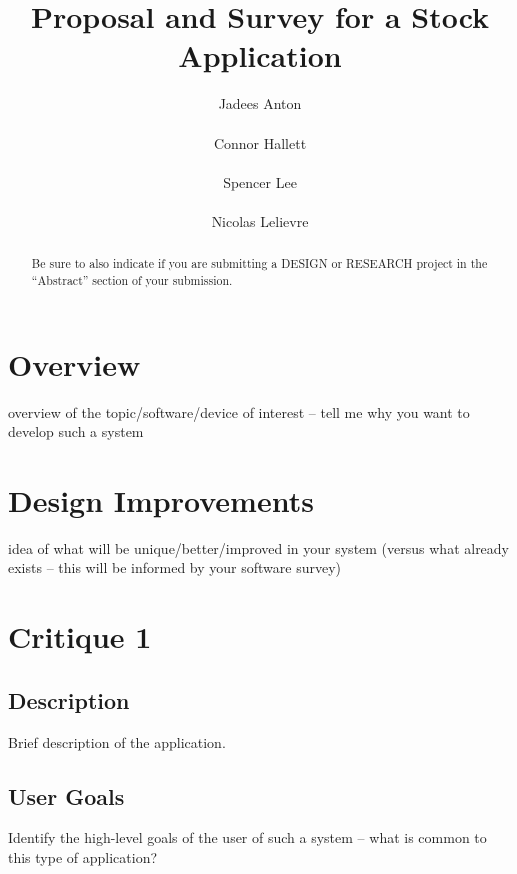 \documentclass{sigchi}
\begin{document}
\title{Proposal and Survey for a Stock Application}
\author{
	\alignauthor Jadees Anton\\
		\\
	\alignauthor Connor Hallett\\
		\\
	\alignauthor Spencer Lee\\
		\\
	\alignauthor Nicolas Lelievre\\
}

\maketitle

\begin{abstract}
Be sure to also indicate if you are submitting a DESIGN or RESEARCH project in the ``Abstract'' section of
your submission.
\end{abstract}


\section{Overview}
overview of the topic/software/device of interest – tell me why you want to develop such a system

\section{Design Improvements}
idea of what will be unique/better/improved in your system (versus what already exists – this will be
informed by your software survey)



\section{Critique 1}
\subsection{Description}
Brief description of the application.

\subsection{User Goals}
Identify the high-level goals of the user of such a system – what is common to this type of
application?
\end{document}
